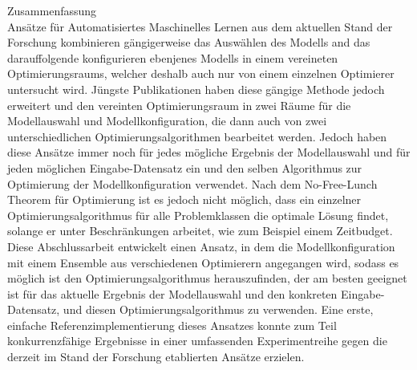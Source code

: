 {Zusammenfassung}\label{sec:abstract-ger}
\vspace*{5mm}\\
Ansätze für Automatisiertes Maschinelles Lernen aus dem aktuellen Stand der Forschung kombinieren gängigerweise das Auswählen des Modells and das darauffolgende konfigurieren ebenjenes Modells in einem vereineten Optimierungsraums, welcher deshalb auch nur von einem einzelnen Optimierer untersucht wird.
Jüngste Publikationen haben diese gängige Methode jedoch erweitert und den vereinten Optimierungsraum in zwei Räume für die Modellauswahl und Modellkonfiguration, die dann auch von zwei unterschiedlichen Optimierungsalgorithmen bearbeitet werden.
Jedoch haben diese Ansätze immer noch für jedes mögliche Ergebnis der Modellauswahl und für jeden möglichen Eingabe-Datensatz ein und den selben Algorithmus zur Optimierung der Modellkonfiguration verwendet.
Nach dem No-Free-Lunch Theorem für Optimierung ist es jedoch nicht möglich, dass ein einzelner Optimierungsalgorithmus für alle Problemklassen die optimale Lösung findet, solange er unter Beschränkungen arbeitet, wie zum Beispiel einem Zeitbudget.
Diese Abschlussarbeit entwickelt einen Ansatz, in dem die Modellkonfiguration mit einem Ensemble aus verschiedenen Optimierern angegangen wird, sodass es möglich ist den Optimierungsalgorithmus herauszufinden, der am besten geeignet ist für das aktuelle Ergebnis der Modellauswahl und den konkreten Eingabe-Datensatz, und diesen Optimierungsalgorithmus zu verwenden.
Eine erste, einfache Referenzimplementierung dieses Ansatzes konnte zum Teil konkurrenzfähige Ergebnisse in einer umfassenden Experimentreihe gegen die derzeit im Stand der Forschung etablierten Ansätze erzielen.
